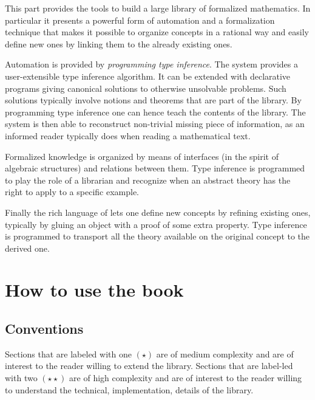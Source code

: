 This part provides the tools to build a large library of formalized
mathematics.  In particular it presents a powerful form of automation
and a formalization technique that makes it possible to organize
concepts in a rational way and easily define new ones by linking them
to the already existing ones.

Automation is provided by \emph{programming type inference}.
The \Coq{} system provides a user-extensible type inference
algorithm.  It can be extended with declarative programs
giving canonical solutions to otherwise unsolvable problems.
Such solutions typically involve notions and theorems that
are part of the \mcbMC{} library.  By programming type inference
one can hence teach \Coq{} the contents of the library.  The system
is then able to reconstruct non-trivial missing piece of information,
as an informed reader typically does when reading a mathematical text.

Formalized knowledge is organized by means of interfaces (in the spirit of
algebraic structures) and relations between them.  Type inference is programmed
to play the role of a librarian and recognize when an abstract theory has the
right to apply to a specific example.

Finally the rich language of \Coq{} lets one define new concepts
by refining existing ones, typically by gluing an object with
a proof of some extra property.  Type inference is programmed
to transport all the theory available on
the original concept to the derived one.



\section*{How to use the book}

\subsection*{Conventions}
Sections that are labeled with one $(\star)$ are of medium complexity and are
of interest to the reader willing to extend the \mcbMC{} library.  Sections
that are label-led with two $(\star\star)$ are of high complexity and are of
interest to the reader willing to understand the technical, implementation,
details of the \mcbMC{} library.

